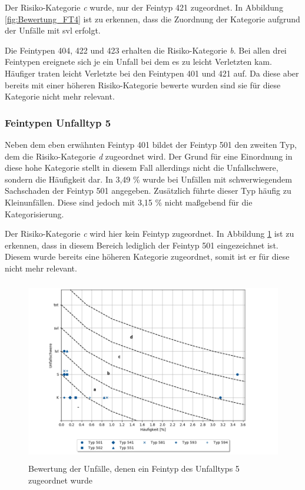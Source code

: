 Der Risiko-Kategorie \textit{c} wurde, nur der Feintyp 421 zugeordnet. In Abbildung \ref{fig:Bewertung_FT4} ist zu erkennen, dass die Zuordnung der Kategorie aufgrund der Unfälle mit \ac{svl} erfolgt.

Die Feintypen 404, 422 und 423 erhalten die Risiko-Kategorie \textit{b}. Bei allen drei Feintypen ereignete sich je ein Unfall bei dem es zu leicht Verletzten kam. Häufiger traten leicht Verletzte bei den Feintypen 401 und 421 auf. Da diese aber bereits mit einer höheren Risiko-Kategorie bewerte wurden sind sie für diese Kategorie nicht mehr relevant.

\subsubsection{Feintypen Unfalltyp 5}
Neben dem eben erwähnten Feintyp 401 bildet der Feintyp 501 den zweiten Typ, dem die Risiko-Kategorie \textit{d} zugeordnet wird. Der Grund für eine Einordnung in diese hohe Kategorie stellt in diesem Fall allerdings nicht die Unfallschwere, sondern die Häufigkeit dar. In 3,49 \% wurde bei Unfällen mit schwerwiegendem Sachschaden der Feintyp 501 angegeben. Zusätzlich führte dieser Typ häufig zu Kleinunfällen. Diese sind jedoch mit 3,15 \% nicht maßgebend für die Kategorisierung.

Der Risiko-Kategorie \textit{c} wird hier kein Feintyp zugeordnet. In Abbildung \ref{fig:Bewertung_FT5} ist zu erkennen, dass in diesem Bereich lediglich der Feintyp 501 eingezeichnet ist. Diesem wurde bereits eine höheren Kategorie zugeordnet, somit ist er für diese nicht mehr relevant.

\begin{savenotes}
	\begin{figure}[H]
		\centering
		\includegraphics[width=12cm,height=8cm]{figures/Bewertung_FT5}
		\caption[Bewertung der Unfälle, denen ein Feintyp des Unfalltyps 5 zugeordnet wurde]{Bewertung der Unfälle, denen ein Feintyp des Unfalltyps 5 zugeordnet wurde}\label{fig:Bewertung_FT5}
	\end{figure}
\end{savenotes}

